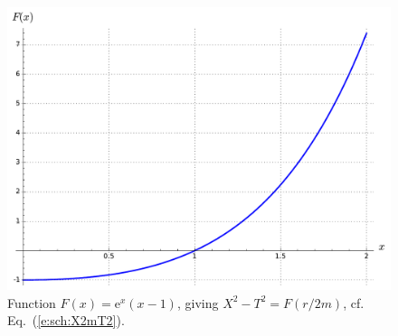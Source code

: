 \begin{figure}
\centerline{\includegraphics[height=0.37\textheight]{sch_X2mT2.pdf}}
\caption[]{\label{f:sch:X2mT2} \footnotesize
Function $F(x) = \mathrm{e}^{x} (x-1)$, giving
$X^2-T^2 = F(r/2m)$, cf. Eq.~(\ref{e:sch:X2mT2}).}
\end{figure}


